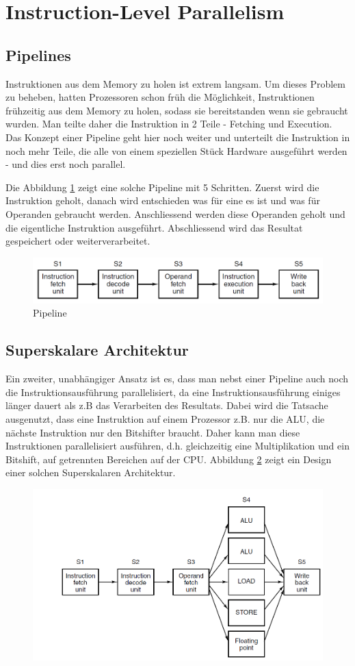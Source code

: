 \section{Instruction-Level Parallelism}

\subsection{Pipelines}
Instruktionen aus dem Memory zu holen ist extrem langsam. Um dieses Problem zu beheben, hatten Prozessoren schon früh die Möglichkeit, Instruktionen frühzeitig aus dem Memory zu holen, sodass sie bereitstanden wenn sie gebraucht wurden.
Man teilte daher die Instruktion in 2 Teile - Fetching und Execution. Das Konzept einer Pipeline geht hier noch weiter und unterteilt die Instruktion in noch mehr Teile, die alle von einem speziellen Stück Hardware ausgeführt werden - und dies erst noch parallel.

Die Abbildung \ref{fig:pipeline} zeigt eine solche Pipeline mit 5 Schritten. Zuerst wird die Instruktion geholt, danach wird entschieden was für eine es ist und was für Operanden gebraucht werden. Anschliessend werden diese Operanden geholt und die eigentliche Instruktion ausgeführt. Abschliessend wird das Resultat gespeichert oder weiterverarbeitet.
\begin{figure}
	\centering
	\includegraphics[width=0.7\linewidth]{fig/pipeline}
	\caption{Pipeline}
	\label{fig:pipeline}
\end{figure}

\subsection{Superskalare Architektur}
Ein zweiter, unabhängiger Ansatz ist es, dass man nebst einer Pipeline auch noch die Instruktionsausführung parallelisiert, da eine Instruktionsausführung einiges länger dauert als z.B das Verarbeiten des Resultats. Dabei wird die Tatsache ausgenutzt, dass eine Instruktion auf einem Prozessor z.B. nur die ALU, die nächste Instruktion nur den Bitshifter braucht. Daher kann man diese Instruktionen parallelisiert ausführen, d.h. gleichzeitig eine Multiplikation und ein Bitshift, auf getrennten Bereichen auf der CPU. Abbildung \ref{fig:superskalar} zeigt ein Design einer solchen Superskalaren Architektur.
\begin{figure}
\centering
\includegraphics[width=0.7\linewidth]{fig/superskalar}
\caption{}
\label{fig:superskalar}
\end{figure}


